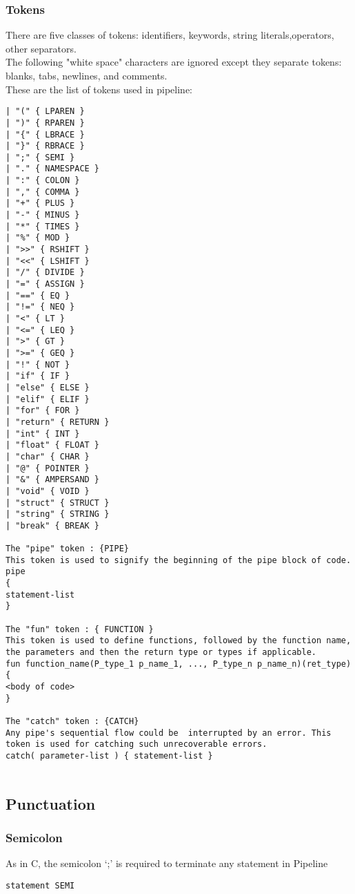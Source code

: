 \documentclass[./LRM_main.tex]{subfiles}
\begin{document}
\subsubsection{Tokens}
There are five classes of tokens:
identifiers, keywords, string literals,operators, other separators.\\
The following "white space" characters are ignored except they separate tokens: blanks, tabs, newlines, and comments.\\
These are the list of tokens used in pipeline:\\
\begin{lstlisting}
| "(" { LPAREN } 
| ")" { RPAREN } 
| "{" { LBRACE } 
| "}" { RBRACE } 
| ";" { SEMI } 
| "." { NAMESPACE }
| ":" { COLON } 
| "," { COMMA } 
| "+" { PLUS } 
| "-" { MINUS }
| "*" { TIMES } 
| "%" { MOD } 
| ">>" { RSHIFT } 
| "<<" { LSHIFT } 
| "/" { DIVIDE } 
| "=" { ASSIGN } 
| "==" { EQ }
| "!=" { NEQ } 
| "<" { LT } 
| "<=" { LEQ } 
| ">" { GT } 
| ">=" { GEQ } 
| "!" { NOT } 
| "if" { IF } 
| "else" { ELSE } 
| "elif" { ELIF } 
| "for" { FOR } 
| "return" { RETURN } 
| "int" { INT }
| "float" { FLOAT } 
| "char" { CHAR }
| "@" { POINTER } 
| "&" { AMPERSAND } 
| "void" { VOID } 
| "struct" { STRUCT } 
| "string" { STRING } 
| "break" { BREAK } 

The "pipe" token : {PIPE}
This token is used to signify the beginning of the pipe block of code. 
pipe
{
statement-list
} 

The "fun" token : { FUNCTION } 
This token is used to define functions, followed by the function name, the parameters and then the return type or types if applicable.
fun function_name(P_type_1 p_name_1, ..., P_type_n p_name_n)(ret_type)
{
<body of code>
}

The "catch" token : {CATCH}
Any pipe's sequential flow could be  interrupted by an error. This token is used for catching such unrecoverable errors.
catch( parameter-list ) { statement-list }


\end{lstlisting}

\subsection{Punctuation}
\subsubsection{Semicolon}
As in C, the semicolon ‘;’ is required to terminate any statement in Pipeline
\begin{lstlisting}
statement SEMI
\end{lstlisting}
\end{document}
